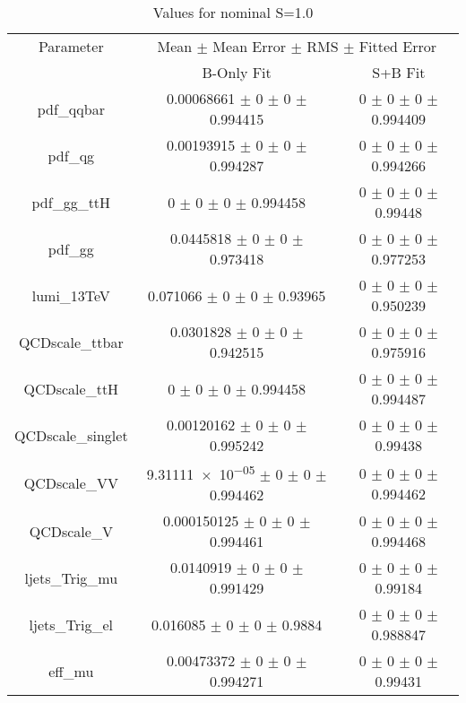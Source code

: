 \begin{table}
\centering
\caption{Values for nominal S=1.0}
\begin{tabular}{ccc}
\toprule
Parameter 	& \multicolumn{2}{c}{Mean $\pm$ Mean Error $\pm$ RMS $\pm$ Fitted Error}\\
 	& B-Only Fit & S+B Fit\\
\midrule
pdf\_qqbar 	& \num{0.00068661} $\pm$ \num{0} $\pm$ \num{0} $\pm$ \num{0.994415} 	& \num{0} $\pm$ \num{0} $\pm$ \num{0} $\pm$ \num{0.994409}\\
pdf\_qg 	& \num{0.00193915} $\pm$ \num{0} $\pm$ \num{0} $\pm$ \num{0.994287} 	& \num{0} $\pm$ \num{0} $\pm$ \num{0} $\pm$ \num{0.994266}\\
pdf\_gg\_ttH 	& \num{0} $\pm$ \num{0} $\pm$ \num{0} $\pm$ \num{0.994458} 	& \num{0} $\pm$ \num{0} $\pm$ \num{0} $\pm$ \num{0.99448}\\
pdf\_gg 	& \num{0.0445818} $\pm$ \num{0} $\pm$ \num{0} $\pm$ \num{0.973418} 	& \num{0} $\pm$ \num{0} $\pm$ \num{0} $\pm$ \num{0.977253}\\
lumi\_13TeV 	& \num{0.071066} $\pm$ \num{0} $\pm$ \num{0} $\pm$ \num{0.93965} 	& \num{0} $\pm$ \num{0} $\pm$ \num{0} $\pm$ \num{0.950239}\\
QCDscale\_ttbar 	& \num{0.0301828} $\pm$ \num{0} $\pm$ \num{0} $\pm$ \num{0.942515} 	& \num{0} $\pm$ \num{0} $\pm$ \num{0} $\pm$ \num{0.975916}\\
QCDscale\_ttH 	& \num{0} $\pm$ \num{0} $\pm$ \num{0} $\pm$ \num{0.994458} 	& \num{0} $\pm$ \num{0} $\pm$ \num{0} $\pm$ \num{0.994487}\\
QCDscale\_singlet 	& \num{0.00120162} $\pm$ \num{0} $\pm$ \num{0} $\pm$ \num{0.995242} 	& \num{0} $\pm$ \num{0} $\pm$ \num{0} $\pm$ \num{0.99438}\\
QCDscale\_VV 	& \num{9.31111e-05} $\pm$ \num{0} $\pm$ \num{0} $\pm$ \num{0.994462} 	& \num{0} $\pm$ \num{0} $\pm$ \num{0} $\pm$ \num{0.994462}\\
QCDscale\_V 	& \num{0.000150125} $\pm$ \num{0} $\pm$ \num{0} $\pm$ \num{0.994461} 	& \num{0} $\pm$ \num{0} $\pm$ \num{0} $\pm$ \num{0.994468}\\
ljets\_Trig\_mu 	& \num{0.0140919} $\pm$ \num{0} $\pm$ \num{0} $\pm$ \num{0.991429} 	& \num{0} $\pm$ \num{0} $\pm$ \num{0} $\pm$ \num{0.99184}\\
ljets\_Trig\_el 	& \num{0.016085} $\pm$ \num{0} $\pm$ \num{0} $\pm$ \num{0.9884} 	& \num{0} $\pm$ \num{0} $\pm$ \num{0} $\pm$ \num{0.988847}\\
eff\_mu 	& \num{0.00473372} $\pm$ \num{0} $\pm$ \num{0} $\pm$ \num{0.994271} 	& \num{0} $\pm$ \num{0} $\pm$ \num{0} $\pm$ \num{0.99431}\\

\end{tabular}
\end{table}
